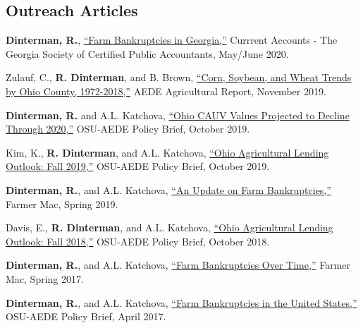 \documentclass[letterpaper]{article}
\renewenvironment{itemize}{
  \begin{list}{}{
    \setlength{\leftmargin}{1.5em}
  }
}{
  \end{list}
}
\begin{document}
\subsection*{Outreach Articles}

\begin{itemize}
\item \textbf{Dinterman, R.}, \href{https://www.gscpa.org/Content/Files/Pdfs/Current%20Accounts/MayJune20%20Articles/FarmBankruptciesGA.pdf}{``Farm Bankruptcies in Georgia,''} Currrent Accounts - The Georgia Society of Certified Public Accountants, May/June 2020.

\item Zulauf, C., \textbf{R. Dinterman}, and B. Brown, \href{https://cpb-us-w2.wpmucdn.com/u.osu.edu/dist/9/29991/files/2019/11/Ohio-yield-trends-1972-2018.pdf}{``Corn, Soybean, and Wheat Trends by Ohio County, 1972-2018,''} AEDE Agricultural Report, November 2019.
\item \textbf{Dinterman, R.} and A.L. Katchova, \href{https://aede.osu.edu/sites/aede/files/publication_files/CAUVProjectionsFall2019.pdf}{``Ohio CAUV Values Projected to Decline Through 2020,''} OSU-AEDE Policy Brief, October 2019.
\item Kim, K., \textbf{R. Dinterman}, and A.L. Katchova, \href{https://aede.osu.edu/sites/aede/files/publication_files/AgLendingOutlook2019.pdf}{``Ohio Agricultural Lending Outlook: Fall 2019,''} OSU-AEDE Policy Brief, October 2019.
\item \textbf{Dinterman, R.}, and A.L. Katchova, \href{https://www.farmermac.com/wp-content/uploads/The-Feed-Spring-2019.pdf}{``An Update on Farm Bankruptcies,''} Farmer Mac, Spring 2019.

\item Davis, E., \textbf{R. Dinterman}, and A.L. Katchova, \href{https://aede.osu.edu/sites/aede/files/publication_files/AgLendingOutlook2018.pdf}{``Ohio Agricultural Lending Outlook: Fall 2018,''} OSU-AEDE Policy Brief, October 2018.

\item \textbf{Dinterman, R.}, and A.L. Katchova, \href{https://www.farmermac.com/wp-content/uploads/The-Feed-Spring-2017.pdf}{``Farm Bankruptcies Over Time,''} Farmer Mac, Spring 2017.
\item \textbf{Dinterman, R.}, and A.L. Katchova, \href{https://aede.osu.edu/sites/aede/files/publication_files/Farm%20Bankruptcies%20-%20Policy%20Brief.pdf}{``Farm Bankruptcies in the United States,''} OSU-AEDE Policy Brief, April 2017.
\end{itemize}
\end{document}
